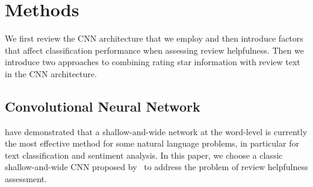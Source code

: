 \documentclass[conference,compsoc]{IEEEtran}
\begin{document}
\section{Methods}\label{sec:model}%

We first review the CNN architecture that we employ and then introduce factors that affect classification performance when assessing review helpfulness. Then we introduce two approaches to combining rating star information with review text in the CNN architecture.

\subsection{Convolutional Neural Network}\cite{Hoa_2017} have demonstrated that a shallow-and-wide network at the word-level is currently the most effective method for some natural language problems, in particular for text classification and sentiment analysis. In this paper, we choose a classic shallow-and-wide CNN proposed by~\cite{Kim14f} to address the problem of review helpfulness assessment.
\end{document}
